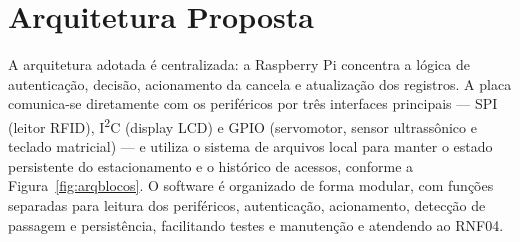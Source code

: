 \documentclass[11pt,a4paper]{article}
\begin{document}
\section{Arquitetura Proposta}\label{sec:arquitetura}

A arquitetura adotada é centralizada: a Raspberry Pi concentra a lógica de
autenticação, decisão, acionamento da cancela e atualização dos registros. A
placa comunica-se diretamente com os periféricos por três interfaces principais
--- SPI (leitor RFID), I\textsuperscript{2}C (display LCD) e GPIO
(servomotor, sensor ultrassônico e teclado matricial) --- e utiliza o sistema de
arquivos local para manter o estado persistente do estacionamento e o histórico
de acessos, conforme a Figura~\ref{fig:arqblocos}. O software é organizado de
forma modular, com funções separadas para leitura dos periféricos, autenticação,
acionamento, detecção de passagem e persistência, facilitando testes e
manutenção e atendendo ao RNF04.
\end{document}
